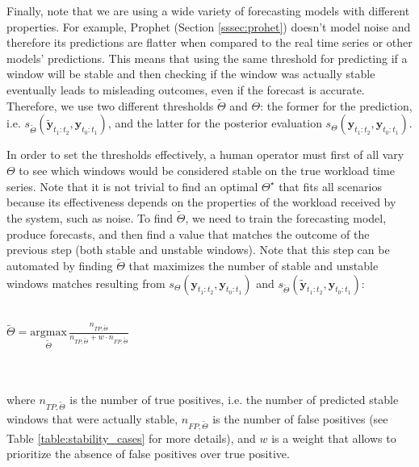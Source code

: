 \documentclass[a4paper, 12pt]{article} %
\begin{document}
	Finally, note that we are using a wide variety of forecasting models with different properties. For example, Prophet (Section \ref{sssec:prohet}) doesn't model noise and therefore its predictions are flatter when compared to the real time series or other models' predictions. This means that using the same threshold for predicting if a window will be stable and then checking if the window was actually stable eventually leads to misleading outcomes, even if the forecast is accurate. Therefore, we use two different thresholds $\tilde{\Theta}$ and $\Theta$: the former for the prediction, i.e. $s_{\tilde{\Theta}}(\tilde{\pmb{y}}_{t_1:t_2}, \pmb{y}_{t_0:t_1})$, and the latter for the posterior evaluation $s_\Theta(\pmb{y}_{t_1:t_2}, \pmb{y}_{t_0:t_1})$.
	
	In order to set the thresholds effectively, a human operator must first of all vary $\Theta$ to see which windows would be considered stable on the true workload time series. Note that it is not trivial to find an optimal $\Theta^\star$ that fits all scenarios because its effectiveness depends on the properties of the workload received by the system, such as noise. To find $\tilde{\Theta}$, we need to train the forecasting model, produce forecasts, and then find a value that matches the outcome of the previous step (both stable and unstable windows). Note that this step can be automated by finding $\tilde{\Theta}$ that maximizes the number of stable and unstable windows matches resulting from $s_\Theta(\pmb{y}_{t_1:t_2}, \pmb{y}_{t_0:t_1})$ and $s_{\tilde{\Theta}}(\tilde{\pmb{y}}_{t_1:t_2}, \pmb{y}_{t_0:t_1})$: \\\\
	\centerline{
	$
		\tilde{\Theta} = \underset{ \tilde{\Theta}} {\mathrm{argmax}}\, \frac{n_{TP, \tilde{\Theta}} }{n_{TP, \tilde{\Theta}} + w \cdot n_{FP, \tilde{\Theta}}}
	$
	}\\\\
	where $n_{TP, \tilde{\Theta}}$ is the number of true positives, i.e. the number of predicted stable windows that were actually stable, $n_{FP, \tilde{\Theta}}$ is the number of false positives (see Table \ref{table:stability_cases} for more details), and $w$ is a weight that allows to prioritize the absence of false positives over true positive.
\end{document}
